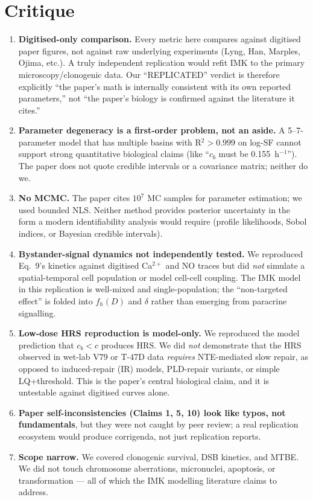 \documentclass[11pt]{article}
\begin{document}
\section{Critique}
\begin{enumerate}
  \item \textbf{Digitised-only comparison.} Every metric here compares
    against digitised paper figures, not against raw underlying
    experiments (Lyng, Han, Marples, Ojima, etc.). A truly independent
    replication would refit IMK to the primary microscopy/clonogenic
    data. Our ``REPLICATED'' verdict is therefore explicitly
    ``the paper's math is internally consistent with its own reported
    parameters,'' not ``the paper's biology is confirmed against the
    literature it cites.''
  \item \textbf{Parameter degeneracy is a first-order problem, not an
    aside.} A 5--7-parameter model that has multiple basins with
    R$^2 > 0.999$ on log-SF cannot support strong quantitative
    biological claims (like ``$c_b$ must be 0.155~h$^{-1}$'').
    The paper does not quote credible intervals or a covariance
    matrix; neither do we.
  \item \textbf{No MCMC.} The paper cites $10^7$ MC samples for
    parameter estimation; we used bounded NLS. Neither method
    provides posterior uncertainty in the form a modern
    identifiability analysis would require (profile likelihoods,
    Sobol indices, or Bayesian credible intervals).
  \item \textbf{Bystander-signal dynamics not independently tested.}
    We reproduced Eq.~9's kinetics against digitised Ca$^{2+}$ and
    NO traces but did \emph{not} simulate a spatial-temporal cell
    population or model cell-cell coupling. The IMK model in this
    replication is well-mixed and single-population; the
    ``non-targeted effect'' is folded into $f_h(D)$ and $\delta$
    rather than emerging from paracrine signalling.
  \item \textbf{Low-dose HRS reproduction is model-only.} We
    reproduced the model prediction that $c_b<c$ produces HRS.
    We did \emph{not} demonstrate that the HRS observed in wet-lab
    V79 or T-47D data \emph{requires} NTE-mediated slow repair, as
    opposed to induced-repair (IR) models, PLD-repair variants, or
    simple LQ+threshold. This is the paper's central biological
    claim, and it is untestable against digitised curves alone.
  \item \textbf{Paper self-inconsistencies (Claims 1, 5, 10) look
    like typos, not fundamentals}, but they were not caught by peer
    review; a real replication ecosystem would produce corrigenda,
    not just replication reports.
  \item \textbf{Scope narrow.} We covered clonogenic survival, DSB
    kinetics, and MTBE. We did not touch chromosome aberrations,
    micronuclei, apoptosis, or transformation --- all of which the
    IMK modelling literature claims to address.
\end{enumerate}
\end{document}
